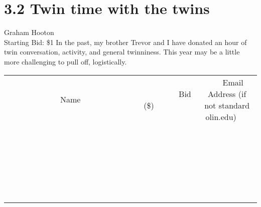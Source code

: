 \documentclass[11pt]{article}
\begin{document}
\section*{3.2 Twin time with the twins}
Graham Hooton
\\
Starting Bid: \$1
\newline
In the past, my brother Trevor and I have donated an hour of twin conversation, activity, and general twinniness. This year may be a little more challenging to pull off, logistically.
\\[6ex]
\begin{tabular}{c c c}
~~~~~~~~~~~~~Name~~~~~~~~~~~~~ & ~~~~~~~~~Bid (\$)~~~~~~~~~  & ~~~Email Address (if not standard olin.edu)~~~\\
 & & \\
\hline
 & & \\
\hline
 & & \\
\hline
 & & \\
\hline
 & & \\
\hline
 & & \\
\hline
 & & \\
\hline
 & & \\
\hline
 & & \\
\hline
 & & \\
\hline
 & & \\
\hline
 & & \\
\hline
 & & \\
\hline
 & & \\
\hline
 & & \\
\hline
 & & \\
\hline
 & & \\
\hline
 & & \\
\hline
 & & \\
\hline
 & & \\
\hline
 & & \\
\hline
 & & \\
\hline
 & & \\
\hline
 & & \\
\hline
 & & \\
\hline
 & & \\
\hline
\end{tabular}
\newpage
\end{document}

